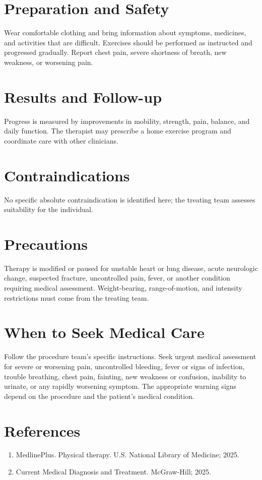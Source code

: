 \section*{Preparation and Safety}
Wear comfortable clothing and bring information about symptoms, medicines, and activities that are difficult. Exercises should be performed as instructed and progressed gradually. Report chest pain, severe shortness of breath, new weakness, or worsening pain.

\section*{Results and Follow-up}
Progress is measured by improvements in mobility, strength, pain, balance, and daily function. The therapist may prescribe a home exercise program and coordinate care with other clinicians.

\section*{Contraindications}
No specific absolute contraindication is identified here; the treating team assesses suitability for the individual.

\section*{Precautions}
Therapy is modified or paused for unstable heart or lung disease, acute neurologic change, suspected fracture, uncontrolled pain, fever, or another condition requiring medical assessment. Weight-bearing, range-of-motion, and intensity restrictions must come from the treating team.

\section*{When to Seek Medical Care}
Follow the procedure team's specific instructions. Seek urgent medical assessment for severe or worsening pain, uncontrolled bleeding, fever or signs of infection, trouble breathing, chest pain, fainting, new weakness or confusion, inability to urinate, or any rapidly worsening symptom. The appropriate warning signs depend on the procedure and the patient's medical condition.

\section*{References}
\begin{enumerate}
  \item MedlinePlus. Physical therapy. U.S. National Library of Medicine; 2025.
  \item Current Medical Diagnosis and Treatment. McGraw-Hill; 2025.
\end{enumerate}
\clearpage
